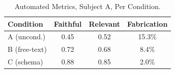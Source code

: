 \begin{table}[htbp]
\caption{Automated Metrics, Subject A, Per Condition.}
\label{tab:automated_metrics}
\centering
\begin{tabular}{lccc}
\toprule
\textbf{Condition} & \textbf{Faithful} & \textbf{Relevant} & \textbf{Fabrication} \\
\midrule
A (uncond.)    & 0.45 & 0.52 & 15.3\% \\
B (free-text)  & 0.72 & 0.68 & 8.4\% \\
C (schema)     & 0.88 & 0.85 & 2.0\% \\
\bottomrule
\end{tabular}
\end{table}
